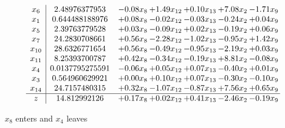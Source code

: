 \documentclass[9pt]{article}
\begin{document}
 \[\begin{array}{c| c c@{\hskip 2pt} c@{\hskip 2pt} c@{\hskip 2pt} c@{\hskip 2pt} c@{\hskip 2pt} }
 x_{6}   &  2.48976377953 & -0.08 x_{8} & +  1.49 x_{12} & +  0.10 x_{13} & +  7.08 x_{2} & -1.71 x_{9}\\
 x_{1}   &  0.644488188976 & +  0.08 x_{8} & -0.02 x_{12} & -0.03 x_{13} & -0.24 x_{2} & +  0.04 x_{9}\\
 x_{5}   &  2.39763779528 & +  0.03 x_{8} & -0.09 x_{12} & +  0.02 x_{13} & -0.19 x_{2} & +  0.06 x_{9}\\
 x_{7}   &  24.2830708661 & +  0.56 x_{8} & -2.28 x_{12} & -1.02 x_{13} & -0.95 x_{2} & +  1.42 x_{9}\\
 x_{10}   &  28.6326771654 & +  0.56 x_{8} & -0.49 x_{12} & -0.95 x_{13} & -2.19 x_{2} & +  0.03 x_{9}\\
 x_{11}   &  8.25393700787 & +  0.42 x_{8} & -0.34 x_{12} & -0.19 x_{13} & +  8.81 x_{2} & -0.08 x_{9}\\
 x_{4}   &  0.0137795275591 & -0.06 x_{8} & +  0.05 x_{12} & +  0.07 x_{13} & -0.40 x_{2} & +  0.01 x_{9}\\
 x_{3}   &  0.564960629921 & +  0.00 x_{8} & +  0.10 x_{12} & +  0.07 x_{13} & -0.30 x_{2} & -0.10 x_{9}\\
 x_{14}   &  24.7157480315 & +  0.32 x_{8} & -1.07 x_{12} & -0.87 x_{13} & +  7.56 x_{2} & +  0.65 x_{9}\\
\hline
z    &  14.812992126 & +  0.17 x_{8} & +  0.02 x_{12} & +  0.41 x_{13} & -2.46 x_{2} & -0.19 x_{9}\\
\end{array}\]


 $ x_{8} $ enters and $ x_{4} $ leaves 
\end{document}
